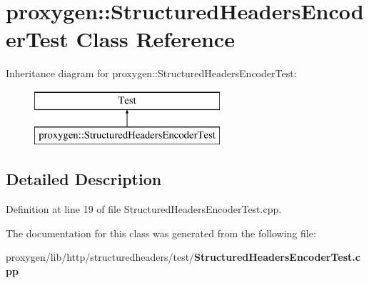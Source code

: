\section{proxygen\+:\+:Structured\+Headers\+Encoder\+Test Class Reference}
\label{classproxygen_1_1StructuredHeadersEncoderTest}
Inheritance diagram for proxygen\+:\+:Structured\+Headers\+Encoder\+Test\+:\begin{figure}[H]
\begin{center}
\leavevmode
\includegraphics[height=2.000000cm]{classproxygen_1_1StructuredHeadersEncoderTest}
\end{center}
\end{figure}


\subsection{Detailed Description}


Definition at line 19 of file Structured\+Headers\+Encoder\+Test.\+cpp.



The documentation for this class was generated from the following file\+:\begin{DoxyCompactItemize}
\item 
proxygen/lib/http/structuredheaders/test/{\bf Structured\+Headers\+Encoder\+Test.\+cpp}\end{DoxyCompactItemize}
